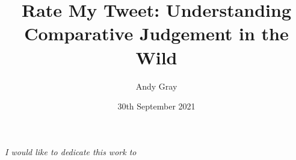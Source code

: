 \documentclass[11pt, a4paper, twoside, openright]{custard}
\begin{document}
	
	\title{Rate My Tweet: Understanding Comparative Judgement in the Wild}
	\author{Andy Gray}
	
	
	
	\date{30th September 2021}
	
	\frontmatter
	\maketitle
	\declaration
	\cleardoublepage
	
	\ifdraftdoc\else
	\begin{vplace}[0.7]
		\begin{large}
			\begin{center}
				\textit{I would like to dedicate this work to\edots}
			\end{center}
		\end{large}
	\end{vplace}
	\fi
\end{document}
